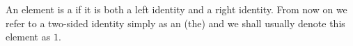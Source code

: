 An element is a  if it is both a left identity and a right identity. From now on we refer to a two-sided identity simply as an (the)  and we shall usually denote this element as $1$.
